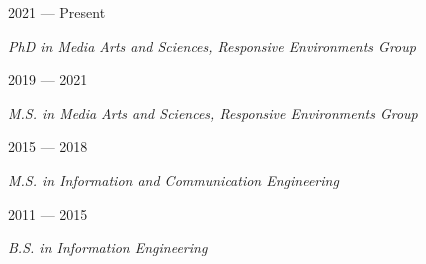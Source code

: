  \hfill 2021 --- Present

\textit{ PhD in Media Arts and Sciences, Responsive Environments Group}

 \hfill 2019 --- 2021

\textit{ M.S. in Media Arts and Sciences, Responsive Environments Group}

 \hfill 2015 --- 2018

\textit{ M.S. in Information and Communication Engineering}

 \hfill 2011 --- 2015

\textit{ B.S. in Information Engineering}
